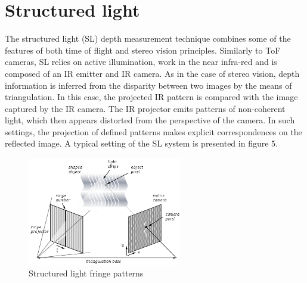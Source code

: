 \section{Structured light}
\label{sec:actuators}

The structured light (SL) depth measurement technique combines some of the features of both time of flight and stereo vision principles.  Similarly to ToF cameras, SL relies on active illumination, work in the near infra-red and is composed of an IR emitter and IR camera. As in the case of stereo vision, depth information is inferred from the disparity between two images by the means of triangulation. In this case, the projected IR pattern is compared with the image captured by the IR camera. The IR projector emits patterns of non-coherent light, which then appears distorted from the perspective of the camera. In such settings, the projection of defined patterns makes explicit correspondences on the reflected image. A typical setting of the SL system is presented in figure 5.


\begin{figure}[H]
\label{fig:sl}
\centering
\includegraphics[width=0.6\textwidth]{fig/structuredlight}
\caption{Structured light fringe patterns \cite{extremetech}}
\label{fig:slprinciple}
\end{figure}

